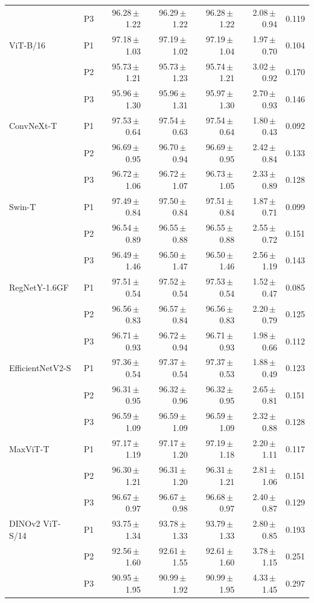 {\begin{longtable}{llrrrrr}
 & P3 & 96.28\,$\pm$\,1.22 & 96.29\,$\pm$\,1.22 & 96.28\,$\pm$\,1.22 & 2.08\,$\pm$\,0.94 & 0.119 \\
ViT-B/16 & P1 & 97.18\,$\pm$\,1.03 & 97.19\,$\pm$\,1.02 & 97.19\,$\pm$\,1.04 & 1.97\,$\pm$\,0.70 & 0.104 \\
 & P2 & 95.73\,$\pm$\,1.21 & 95.73\,$\pm$\,1.23 & 95.74\,$\pm$\,1.21 & 3.02\,$\pm$\,0.92 & 0.170 \\
 & P3 & 95.96\,$\pm$\,1.30 & 95.96\,$\pm$\,1.31 & 95.97\,$\pm$\,1.30 & 2.70\,$\pm$\,0.93 & 0.146 \\
ConvNeXt-T & P1 & 97.53\,$\pm$\,0.64 & 97.54\,$\pm$\,0.63 & 97.54\,$\pm$\,0.64 & 1.80\,$\pm$\,0.43 & 0.092 \\
 & P2 & 96.69\,$\pm$\,0.95 & 96.70\,$\pm$\,0.94 & 96.69\,$\pm$\,0.95 & 2.42\,$\pm$\,0.84 & 0.133 \\
 & P3 & 96.72\,$\pm$\,1.06 & 96.72\,$\pm$\,1.07 & 96.73\,$\pm$\,1.05 & 2.33\,$\pm$\,0.89 & 0.128 \\
Swin-T & P1 & 97.49\,$\pm$\,0.84 & 97.50\,$\pm$\,0.84 & 97.51\,$\pm$\,0.84 & 1.87\,$\pm$\,0.71 & 0.099 \\
 & P2 & 96.54\,$\pm$\,0.89 & 96.55\,$\pm$\,0.88 & 96.55\,$\pm$\,0.88 & 2.55\,$\pm$\,0.72 & 0.151 \\
 & P3 & 96.49\,$\pm$\,1.46 & 96.50\,$\pm$\,1.47 & 96.50\,$\pm$\,1.46 & 2.56\,$\pm$\,1.19 & 0.143 \\
RegNetY-1.6GF & P1 & 97.51\,$\pm$\,0.54 & 97.52\,$\pm$\,0.54 & 97.53\,$\pm$\,0.54 & 1.52\,$\pm$\,0.47 & 0.085 \\
 & P2 & 96.56\,$\pm$\,0.83 & 96.57\,$\pm$\,0.84 & 96.56\,$\pm$\,0.83 & 2.20\,$\pm$\,0.79 & 0.125 \\
 & P3 & 96.71\,$\pm$\,0.93 & 96.72\,$\pm$\,0.94 & 96.71\,$\pm$\,0.93 & 1.98\,$\pm$\,0.66 & 0.112 \\
EfficientNetV2-S & P1 & 97.36\,$\pm$\,0.54 & 97.37\,$\pm$\,0.54 & 97.37\,$\pm$\,0.53 & 1.88\,$\pm$\,0.49 & 0.123 \\
 & P2 & 96.31\,$\pm$\,0.95 & 96.32\,$\pm$\,0.96 & 96.32\,$\pm$\,0.95 & 2.65\,$\pm$\,0.81 & 0.151 \\
 & P3 & 96.59\,$\pm$\,1.09 & 96.59\,$\pm$\,1.09 & 96.59\,$\pm$\,1.09 & 2.32\,$\pm$\,0.88 & 0.128 \\
MaxViT-T & P1 & 97.17\,$\pm$\,1.19 & 97.17\,$\pm$\,1.20 & 97.19\,$\pm$\,1.18 & 2.20\,$\pm$\,1.11 & 0.117 \\
 & P2 & 96.30\,$\pm$\,1.21 & 96.31\,$\pm$\,1.20 & 96.31\,$\pm$\,1.21 & 2.81\,$\pm$\,1.06 & 0.151 \\
 & P3 & 96.67\,$\pm$\,0.97 & 96.67\,$\pm$\,0.98 & 96.68\,$\pm$\,0.97 & 2.40\,$\pm$\,0.87 & 0.129 \\
DINOv2 ViT-S/14 & P1 & 93.75\,$\pm$\,1.34 & 93.78\,$\pm$\,1.33 & 93.79\,$\pm$\,1.33 & 2.80\,$\pm$\,0.85 & 0.193 \\
 & P2 & 92.56\,$\pm$\,1.60 & 92.61\,$\pm$\,1.55 & 92.61\,$\pm$\,1.60 & 3.78\,$\pm$\,1.15 & 0.251 \\
 & P3 & 90.95\,$\pm$\,1.95 & 90.99\,$\pm$\,1.92 & 90.99\,$\pm$\,1.95 & 4.33\,$\pm$\,1.45 & 0.297 \\
\end{longtable}
}
